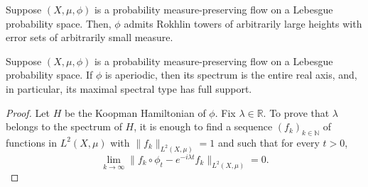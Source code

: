 \documentclass[10pt,a4paper]{amsart}
\begin{document}
\begin{lemma}
    \label{lem:rokhlin}
    Suppose $(X,\mu,\phi)$ is a probability measure-preserving flow on a Lebesgue probability space. Then, $\phi$ admits  Rokhlin towers of arbitrarily large heights with error sets of arbitrarily small measure.
\end{lemma}

\begin{lemma} 
\label{lemma:no_gaps}
Suppose $(X,\mu,\phi)$ is a probability measure-preserving flow on a Lebesgue probability space. If $\phi$ is aperiodic, then its spectrum is the entire real axis, and, in particular, its maximal spectral type has full support.
\end{lemma}

\begin{proof} 
Let $H$ be the Koopman Hamiltonian of $\phi$. Fix $\lambda \in \mathbb{R}$. To prove that $\lambda$ belongs to the spectrum of $H$, it is enough to find a sequence $(f_k)_{k \in \mathbb{N}}$ of functions in $L^2(X,\mu)$ with $\|f_k\|_{L^2(X,\mu)} = 1$ and such that for every $t > 0$,
\begin{equation}
\label{eq:spec_lim}
\lim_{k \to \infty} \|f_k \circ \phi_t - e^{-i\lambda t} f_k\|_{L^2(X,\mu)} = 0.
\end{equation}


\end{proof}
\end{document}
